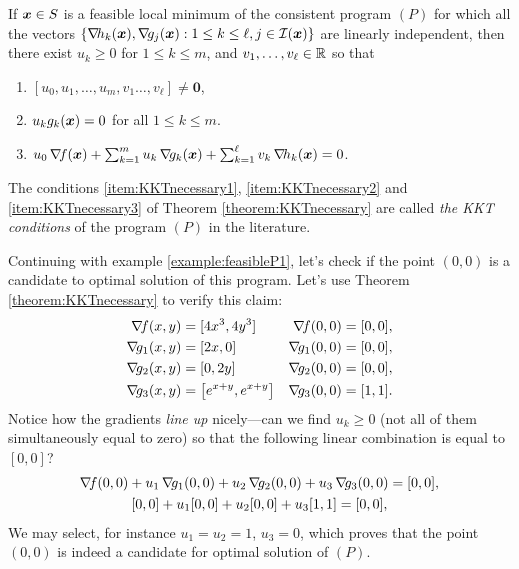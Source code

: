 \begin{theorem}\label{theorem:KKTnecessary}
If $\boldsymbol{x} \in S$ is a feasible local minimum of the consistent program $(P)$ for which all the vectors $\{ \mathop{\nabla\! {h_k}}(\boldsymbol{x}), \mathop{\nabla\! {g_j}}(\boldsymbol{x}) : 1 \leq k \leq \ell, j \in \mathcal{I}(\boldsymbol{x}) \}$ are linearly independent, then there exist $u_k \geq 0$ for $1\leq k \leq m$, and $v_1, \dots, v_\ell \in \mathbb{R}$ so that
\begin{enumerate}
 	\item\label{item:KKTnecessary1} $[u_0, u_1, \dotsc, u_m, v_1 \dotsc, v_\ell ] \neq \boldsymbol{0}$,
 	\item\label{item:KKTnecessary2} $u_k g_k(\boldsymbol{x}) = 0$ for all $1 \leq k \leq m$.
 	\item\label{item:KKTnecessary3} $u_0 \mathop{\nabla\! {f}}(\boldsymbol{x}) + \sum_{k=1}^m u_k \mathop{\nabla\! {g_k}}(\boldsymbol{x}) + \sum_{k=1}^\ell v_k \mathop{\nabla\! {h_k}}(\boldsymbol{x}) = 0$.
 \end{enumerate}
\end{theorem}

\begin{remark}
The conditions \ref{item:KKTnecessary1}, \ref{item:KKTnecessary2} and \ref{item:KKTnecessary3} of Theorem \ref{theorem:KKTnecessary} are called \emph{the KKT conditions} of the program $(P)$ in the literature.
\end{remark}

\begin{example}
Continuing with example \ref{example:feasibleP1}, let's check if the point $(0,0)$ is a candidate to optimal solution of this program.  Let's use Theorem \ref{theorem:KKTnecessary} to verify this claim:
\begin{align*}
\gradient{f}(x,y) &= [ 4x^3, 4y^3 ] &\gradient{f}(0,0) &= [0,0], \\
\gradient{g_1}(x,y) &= [ 2x, 0 ] &\gradient{g_1}(0,0) &= [0,0], \\
\gradient{g_2}(x,y) &= [0, 2y] &\gradient{g_2}(0,0) &= [0,0], \\
\gradient{g_3}(x,y) &= \big[e^{x+y}, e^{x+y} \big] &\gradient{g_3}(0,0) &= [1,1].
\end{align*}
Notice how the gradients \emph{line up} nicely---can we find $u_k \geq 0$ (not all of them simultaneously equal to zero) so that the following linear combination is equal to $[0,0]$?
\begin{gather*}
\mathop{\nabla\! {f}}(0,0) + u_1 \mathop{\nabla\! {g_1}}(0,0) + u_2 \mathop{\nabla\! {g_2}}(0,0) + u_3 \mathop{\nabla\! {g_3}}(0,0) = [0,0], \\
[0,0] + u_1[0,0] + u_2[0,0] +u_3[1,1] = [0,0],
\end{gather*}
We may select, for instance $u_1=u_2=1$, $u_3=0$, which proves that the point $(0,0)$ is indeed a candidate for optimal solution of $(P)$.
\end{example}

